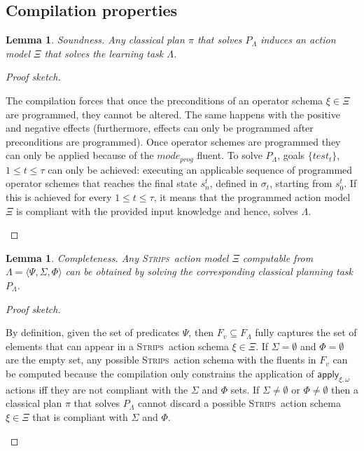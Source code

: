 \documentclass{article}
\newcommand{\tup}[1]{{\langle #1 \rangle}}
\newcommand{\strips}{\textsc{Strips}}     %
\newtheorem{lemma}[theorem]{Lemma}
\begin{document}
\subsection{Compilation properties}

\begin{lemma}
Soundness. Any classical plan $\pi$ that solves $P_{\Lambda}$ induces an action model $\Xi$ that solves the learning task $\Lambda$.
\end{lemma}

\begin{proof}[Proof sketch]
\begin{small}
The compilation forces that once the preconditions of an operator schema $\xi \in \Xi$ are programmed, they cannot be altered. The same happens with the positive and negative effects (furthermore, effects can only be programmed after preconditions are programmed). Once operator schemes are programmed they can only be applied because of the $mode_{prog}$ fluent. To solve $P_{\Lambda}$, goals $\{test_t\}$, {\small $1\leq t\leq \tau$} can only be achieved: executing an applicable sequence of programmed operator schemes that reaches the final state $s_n^t$, defined in $\sigma_t$, starting from $s_0^t$. If this is achieved for every {\small $1\leq t\leq \tau$}, it means that the programmed action model $\Xi$ is compliant with the provided input knowledge and hence, solves $\Lambda$.
\end{small}
\end{proof}


\begin{lemma}
Completeness. Any \strips\ action model $\Xi$ computable from $\Lambda=\tup{\Psi,\Sigma,\Phi}$ can be obtained by solving the corresponding classical planning task $P_{\Lambda}$.
\end{lemma}

\begin{proof}[Proof sketch]
\begin{small}
By definition, given the set of predicates $\Psi$, then $F_v\subseteq F_\Lambda$ fully captures the set of elements that can appear in a \strips\ action schema $\xi\in\Xi$. If $\Sigma=\emptyset$ and $\Phi=\emptyset$ are the empty set, any possible \strips\ action schema with the fluents in $F_v$ can be computed because the compilation only constrains the application of $\mathsf{apply_{\xi,\omega}}$ actions iff they are not compliant with the $\Sigma$ and $\Phi$ sets. If $\Sigma\neq\emptyset$ or $\Phi\neq\emptyset$ then a classical plan $\pi$ that solves $P_{\Lambda}$ cannot discard a possible \strips\ action schema $\xi\in\Xi$ that is compliant with $\Sigma$ and $\Phi$.
\end{small}
\end{proof}
\end{document}
